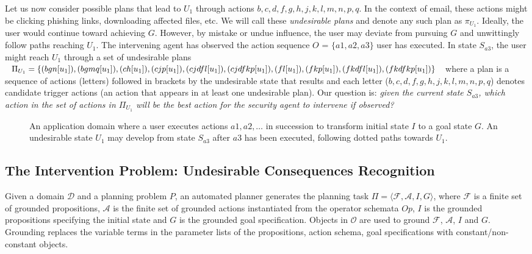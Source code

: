 Let us now consider possible plans that lead to $U_1$ through actions $b, c, d, f, g, h, j, k, l, m, n, p, q$. In the context of email, these actions might be clicking phishing links, downloading affected files, etc. We will call these \emph{undesirable plans} and denote any such plan as $\pi_{U_1}$.
Ideally, the user would continue toward achieving $G$. However, by mistake or undue influence, the user may deviate from pursuing $G$ and unwittingly follow paths reaching $U_1$. The intervening agent has observed the action sequence $O$ = $\{a1, a2, a3\}$ user has executed. In state $S_{a3}$, the user might reach $U_1$ through a set of undesirable plans $\Pi_{U_1}=\{(bgn[u_1]), (bgmq[u_1]), (ch[u_1]), (cjp[u_1]), (cjdfl[u_1]),(cjdfkp[u_1]), \\(fl[u_1]), (fkp[u_1]),(fkdfl[u_1]), (fkdfkp[u_1])\}$ where a plan is a sequence of actions (letters) followed in brackets by the undesirable state that results and each letter ($b, c, d, f, g, h, j, k, l, m, n, p, q$) denotes candidate trigger actions (an action that appears in at least one undesirable plan). Our question is: \textit{given the current state $S_{a3}$, which action in the set of actions in $\Pi_{U_1}$ will be the best action for the security agent to intervene if observed?}
\begin{figure}[pbt]
	\caption{An application domain where a user executes actions $a1, a2, \ldots $ in succession to transform initial state $I$ to a goal state $G$. An undesirable state $U_1$ may develop from state $S_{a3}$ after $a3$ has been executed, following dotted paths towards $U_1$.}
\label{fig:cybersecproblem}
\end{figure}

\subsection{The Intervention Problem: Undesirable Consequences Recognition}
Given a domain $\mathcal{D}$ and a planning problem $P$, an automated planner generates the planning task $\Pi=\langle \mathcal{F}, \mathcal{A}, I, G\rangle$, where $\mathcal{F}$ is a finite set of grounded propositions, $\mathcal{A}$ is the finite set of grounded actions instantiated from the operator schemata $Op$, $I$ is the grounded propositions specifying the initial state and $G$ is the grounded goal specification. Objects in $\mathcal{O}$ are used to ground $\mathcal{F}$, $\mathcal{A}$, $I$ and $G$. Grounding replaces the variable terms in the parameter lists of the propositions, action schema, goal specifications with constant/non-constant objects. 

